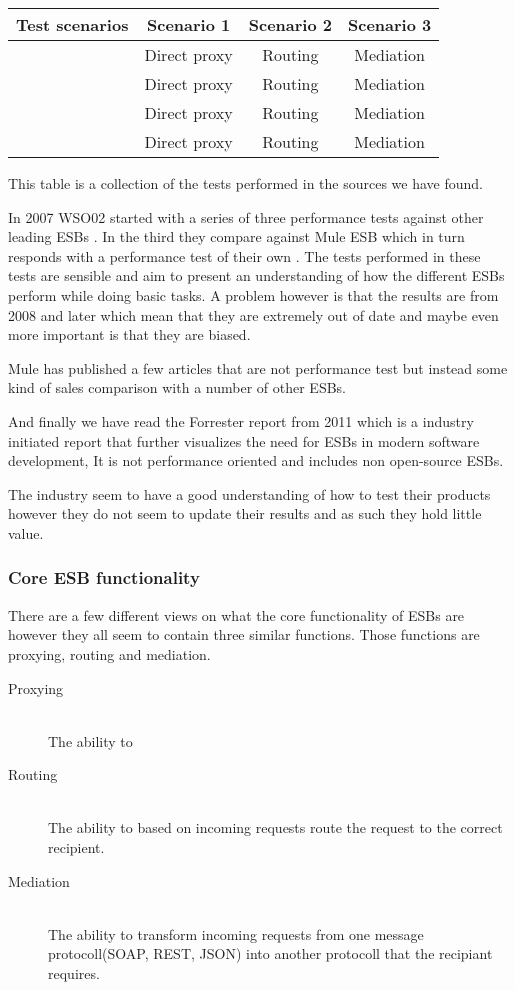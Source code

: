 \begin{tabular}{| c | c | c | c |}
	\hline
	Test scenarios & Scenario 1 & Scenario 2 & Scenario 3 \\
	\hline
	\cite{mulesoft08} & Direct proxy & Routing & Mediation \\
	\hline
	\cite{Perera07} & Direct proxy & Routing & Mediation \\
	\hline
	\cite{Perera07R2} & Direct proxy & Routing & Mediation \\
	\hline
	\cite{Perera07R3} & Direct proxy & Routing & Mediation \\
	\hline
\end{tabular}
This table is a collection of the tests performed in the sources we have found. 

In 2007 WSO02 started with a series of three performance tests against other leading ESBs \cite{Perera07,Perera07R2,Perera07R3}. In the third they compare against Mule ESB which in turn responds with a performance test of their own \cite{mulesoft08}. The tests performed in these tests are sensible and aim to present an understanding of how the different ESBs perform while doing basic tasks. A problem however is that the results are from 2008 and later which mean that they are extremely out of date and maybe even more important is that they are biased.


Mule has published a few articles that are not performance test but instead some kind of sales comparison with a number of other ESBs\cite{mulevsjboss,mulevsglassfish,mulevsservicemix}.

And finally we have read the Forrester report \cite{forrester11} from 2011 which is a industry initiated report that further visualizes the need for ESBs in modern software development, It is not performance oriented and includes non open-source ESBs.

The industry seem to have a good understanding of how to test their products however they do not seem to update their results and as such they hold little value.

\subsubsection{Core ESB functionality}
There are a few different views on what the core functionality of ESBs are however they all seem to contain three similar functions. Those functions are proxying, routing and mediation. 

\begin{description}
	\item[Proxying] \hfill \\
			The ability to 
	\item[Routing] \hfill \\
			The ability to based on incoming requests route the request to the correct recipient.
	\item[Mediation] \hfill \\
			The ability to transform incoming requests from one message protocoll(SOAP, REST, JSON) into another protocoll that the recipiant requires.
\end{description}

